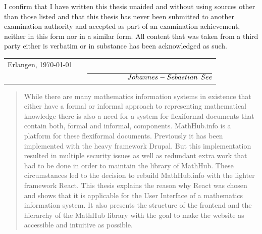 \documentclass[11pt,a4paper]{article}
\begin{document}
\thispagestyle{empty}
I confirm that I have written this thesis unaided and without using sources other than those listed and that this thesis has never been submitted to another examination authority and accepted as part of an examination achievement, neither in this form nor in a similar form. 
All content that was taken from a third party either is verbatim or in substance has been acknowledged as such. \par
\vspace{1.5cm}
\hspace{-0.34cm} \begin{tabularx}{14.2cm}{l X r}
Erlangen, \today & & \\
& & $\overline{\hspace{2cm} Johannes-Sebastian \hspace{1ex} See}$ \\
\end{tabularx}
\newpage
\begin{abstract}
\noindent While there are many mathematics information systems in existence that either have a formal or informal approach to representing mathematical knowledge there is also a need for a system for flexiformal documents that contain both, formal and informal, components.
MathHub.info is a platform for these flexiformal documents.
Previously it has been implemented with the heavy framework Drupal.
But this implementation resulted in multiple security issues as well as redundant extra work that had to be done in order to maintain the library of MathHub.
These circumstances led to the decision to rebuild MathHub.info with the lighter framework React.
\newline \newline
This thesis explains the reason why React was chosen and shows that it is applicable for the User Interface of a mathematics information system.
It also presents the structure of the frontend and the hierarchy of the MathHub library with the goal to make the website as accessible and intuitive as possible.
  
\end{abstract}
\newpage  
\thispagestyle{empty}
\tableofcontents
\pagebreak
{}
\end{document}
